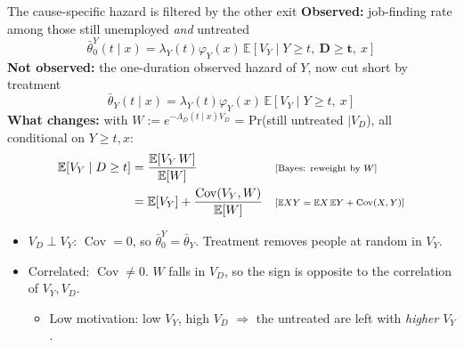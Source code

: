 \documentclass[aspectratio=169,10pt]{beamer}
\newcommand{\E}{\mathbb{E}}
\newcommand{\cov}{\operatorname{Cov}}
\newcommand{\why}[1]{\text{\scriptsize[#1]}}
\begin{document}
\begin{frame}{The cause-specific hazard is filtered by the other exit}
  \small
  \textbf{Observed:} job-finding rate among those still unemployed \emph{and} untreated
  \[ \bar\theta^Y_0(t\mid x)=\lambda_Y(t)\varphi_Y(x)\,\E[V_Y\mid Y\ge t,\ \mathbf{D\ge t},\ x] \]
  \textbf{Not observed:} the one-duration observed hazard of $Y$, now cut short by treatment
  \[ \bar\theta_Y(t\mid x)=\lambda_Y(t)\varphi_Y(x)\,\E[V_Y\mid Y\ge t,\ x] \]
  \textbf{What changes:} with $W:=e^{-\Lambda_D(t\mid x)V_D}$ = Pr(still untreated $\mid V_D$), all conditional on $Y\ge t,x$:
  \begin{align*}
    \E[V_Y\mid D\ge t] &= \frac{\E[V_Y\,W]}{\E[W]} && \why{Bayes: reweight by $W$} \\
    &= \E[V_Y]+\frac{\cov(V_Y,W)}{\E[W]} && \why{$\E XY=\E X\,\E Y+\cov(X,Y)$}
  \end{align*}
  \begin{itemize}
    \item $V_D\perp V_Y$: $\cov=0$, so $\bar\theta^Y_0=\bar\theta_Y$. Treatment removes people at random in $V_Y$.
    \item Correlated: $\cov\neq0$. $W$ falls in $V_D$, so the sign is opposite to the correlation of $V_Y,V_D$.
      \begin{itemize}
        \item Low motivation: low $V_Y$, high $V_D$ $\Rightarrow$ the untreated are left with \emph{higher} $V_Y$.
      \end{itemize}
  \end{itemize}
\end{frame}
\end{document}
